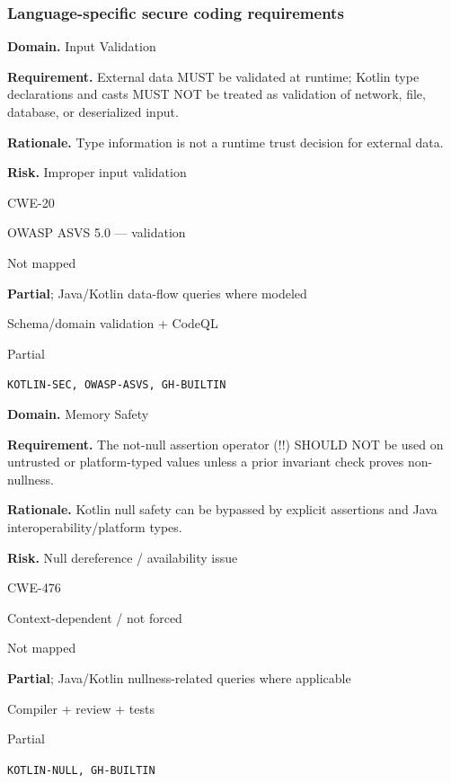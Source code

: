 \documentclass[10pt,letterpaper]{article}
\newcommand{\prioritybadge}[2]{\tcbox[on line,boxrule=0pt,arc=1.2mm,boxsep=0.7mm,left=1mm,right=1mm,top=0.4mm,bottom=0.4mm,colback=#2!12,coltext=#2]{\scriptsize\bfseries #1}}
\begin{document}
\subsubsection*{Language-specific secure coding requirements}

\begin{rulebox}[title={\texttt{SCS-KOTLIN-INPUT-001} \hfill \prioritybadge{High Priority}{High}}]
\textbf{Domain.} Input Validation

\textbf{Requirement.} External data MUST be validated at runtime; Kotlin type declarations and casts MUST NOT be treated as validation of network, file, database, or deserialized input.

\textbf{Rationale.} Type information is not a runtime trust decision for external data.

\textbf{Risk.} Improper input validation

\begin{description}[leftmargin=2.65cm,labelwidth=2.3cm,style=nextline,itemsep=1pt,topsep=3pt]
  \item[CWE] CWE-20
  \item[OWASP] OWASP ASVS 5.0 --- validation
  \item[CERT] Not mapped
  \item[CodeQL] \textbf{Partial}; Java/Kotlin data-flow queries where modeled
  \item[Enforcement] Schema/domain validation + CodeQL
  \item[Automation] Partial
  \item[Sources] \texttt{KOTLIN-SEC, OWASP-ASVS, GH-BUILTIN}
\end{description}
\end{rulebox}

\begin{rulebox}[title={\texttt{SCS-KOTLIN-MEM-001} \hfill \prioritybadge{High Priority}{High}}]
\textbf{Domain.} Memory Safety

\textbf{Requirement.} The not-null assertion operator (!!) SHOULD NOT be used on untrusted or platform-typed values unless a prior invariant check proves non-nullness.

\textbf{Rationale.} Kotlin null safety can be bypassed by explicit assertions and Java interoperability/platform types.

\textbf{Risk.} Null dereference / availability issue

\begin{description}[leftmargin=2.65cm,labelwidth=2.3cm,style=nextline,itemsep=1pt,topsep=3pt]
  \item[CWE] CWE-476
  \item[OWASP] Context-dependent / not forced
  \item[CERT] Not mapped
  \item[CodeQL] \textbf{Partial}; Java/Kotlin nullness-related queries where applicable
  \item[Enforcement] Compiler + review + tests
  \item[Automation] Partial
  \item[Sources] \texttt{KOTLIN-NULL, GH-BUILTIN}
\end{description}
\end{rulebox}
\end{document}
